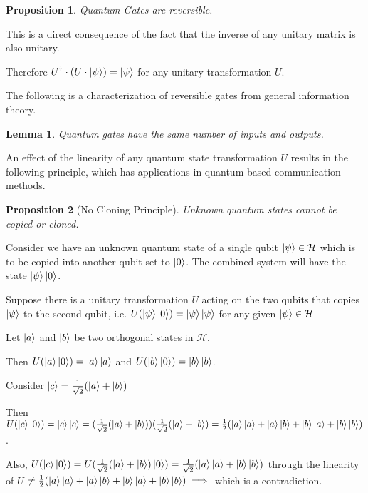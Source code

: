 \documentclass[12pt,twoside,fleqn]{report}
\makeatletter
\theoremstyle{thmstyle}
\renewenvironment{proof}[1][\proofname]{\par
\pushQED{\qed}%
\normalfont \topsep6\p@\@plus6\p@\relax
\trivlist
\item[\hskip\labelsep\itshape#1\@addpunct{.}]\mbox{}\par\nobreak\ignorespaces
}{%
    \popQED\endtrivlist\@endpefalse
    }
\newtheorem{lemma}{Lemma}[chapter]
\newtheorem{prop}{Proposition}[chapter]
\makeatother
\begin{document}
\begin{prop}
    Quantum Gates are reversible.
\end{prop}
\begin{proof}
    This is a direct consequence of the fact that the inverse of any unitary matrix is also unitary.

    Therefore $U^\dagger \cdot (U \cdot \ket\psi) = \ket\psi$ for any unitary transformation $U$.
\end{proof}

The following is a characterization of reversible gates from general information theory.
\begin{lemma}
    Quantum gates have the same number of inputs and outputs.
\end{lemma}

An effect of the linearity of any quantum state transformation $U$ results in the following principle, which has applications in quantum-based communication methods.

\begin{prop}[No Cloning Principle]
    Unknown quantum states cannot be copied or cloned.
\end{prop}
\begin{proof}
    Consider we have an unknown quantum state of a single qubit $\ket\psi \in \mathcal{H}$ which is to be copied into another qubit set to $\ket{0}$.  The combined system will have the state $\ket\psi \ket{0}$.

    Suppose there is a unitary transformation $U$ acting on the two qubits that copies $\ket\psi$ to the second qubit, i.e.
    $U(\ket\psi \ket{0}) = \ket{\psi} \ket\psi$ for any given $\ket\psi \in \mathcal{H}$
    
    Let $\ket{a}$ and $\ket{b}$ be two orthogonal states in $\mathcal{H}$.

    Then $U(\ket{a}\ket{0}) = \ket{a}\ket{a}$ and $U(\ket{b}\ket{0}) = \ket{b} \ket{b}$.

    Consider $\ket{c} = \frac{1}{\sqrt{2}} (\ket{a} + \ket{b})$

    Then $U(\ket{c}\ket{0}) = \ket{c} \ket{c} = (\frac{1}{\sqrt{2}} (\ket{a} + \ket{b}) ) (\frac{1}{\sqrt{2}} (\ket{a} + \ket{b}) = \frac{1}{2} (\ket{a}\ket{a} + \ket{a}\ket{b} + \ket{b}\ket{a} + \ket{b}\ket{b})$.

    Also, $U (\ket{c} \ket{0}) = U(\frac{1}{\sqrt{2}} (\ket{a} + \ket{b}) \ket{0}) = \frac{1}{\sqrt{2}} (\ket{a}\ket{a} + \ket{b}\ket{b})$ through the linearity of $U$ $\neq \frac{1}{2} (\ket{a}\ket{a} + \ket{a}\ket{b} + \ket{b}\ket{a} + \ket{b}\ket{b}) \implies $ which is a contradiction.

\end{proof}
\end{document}
